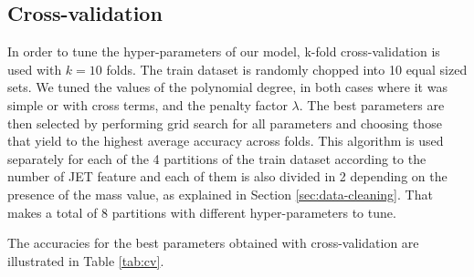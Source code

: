 \documentclass[10pt,conference,compsocconf]{IEEEtran}
\begin{document}

\subsection{Cross-validation}
\label{sec:cv}

In order to tune the hyper-parameters of our model, k-fold cross-validation is used with $k=10$ folds. The train dataset is randomly chopped into 10 equal sized sets. We tuned the values of the polynomial degree, in both cases where it was simple or with cross terms, and the penalty factor $\lambda$. The best parameters are then selected by performing grid search for all parameters and choosing those that yield to the highest average accuracy across folds. This algorithm is used separately for each of the 4 partitions of the train dataset according to the number of JET feature and each of them is also divided in 2 depending on the presence of the mass value, as explained in Section \ref{sec:data-cleaning}. That makes a total of 8 partitions with different hyper-parameters to tune.

The accuracies for the best parameters obtained with cross-validation are illustrated in Table \ref{tab:cv}.
\end{document}
